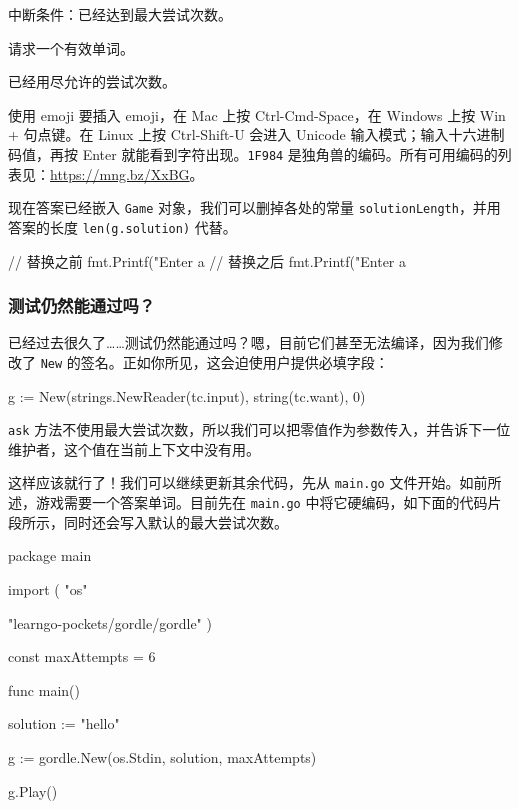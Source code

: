 \begin{codeannotations}
  \item 中断条件：已经达到最大尝试次数。
  \item 请求一个有效单词。
  \item 已经用尽允许的尝试次数。
\end{codeannotations}

\begin{infobox}{使用 emoji}
要插入 emoji，在 Mac 上按 Ctrl-Cmd-Space，在 Windows 上按 Win + 句点键。在 Linux 上按 Ctrl-Shift-U 会进入 Unicode 输入模式；输入十六进制码值，再按 Enter 就能看到字符出现。\texttt{1F984} 是独角兽的编码。所有可用编码的列表见：\url{https://mng.bz/XxBG}。
\end{infobox}

现在答案已经嵌入 \texttt{Game} 对象，我们可以删掉各处的常量 \texttt{solutionLength}，并用答案的长度 \texttt{len(g.solution)} 代替。

\begin{gocode}[title={代码清单 5.20 \texttt{game.go}：替换示例}]
// 替换之前
fmt.Printf("Enter a %
// 替换之后
fmt.Printf("Enter a %
\end{gocode}

\subsubsection*{测试仍然能通过吗？}

已经过去很久了……测试仍然能通过吗？嗯，目前它们甚至无法编译，因为我们修改了 \texttt{New} 的签名。正如你所见，这会迫使用户提供必填字段：

\begin{gocode}[]
g := New(strings.NewReader(tc.input), string(tc.want), 0)
\end{gocode}

\texttt{ask} 方法不使用最大尝试次数，所以我们可以把零值作为参数传入，并告诉下一位维护者，这个值在当前上下文中没有用。

这样应该就行了！我们可以继续更新其余代码，先从 \texttt{main.go} 文件开始。如前所述，游戏需要一个答案单词。目前先在 \texttt{main.go} 中将它硬编码，如下面的代码片段所示，同时还会写入默认的最大尝试次数。

\begin{gocode}[title={代码清单 5.21 \texttt{main.go}：在 \texttt{main} 中硬编码答案，并更新 \texttt{New()}}]
package main

import (
    "os"

    "learngo-pockets/gordle/gordle"
)

const maxAttempts = 6

func main() {
    solution := "hello"

    g := gordle.New(os.Stdin, solution, maxAttempts)

    g.Play()
}
\end{gocode}

